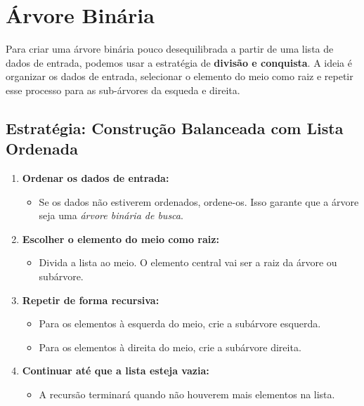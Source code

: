 \documentclass[a4paper,12pt]{article}
\begin{document}
\section*{Árvore Binária}

Para criar uma árvore binária pouco desequilibrada a partir de uma lista de dados de entrada, podemos usar a estratégia de \textbf{divisão e conquista}. A ideia é organizar os dados de entrada, selecionar o elemento do meio como raiz e repetir esse processo para as sub-árvores da esqueda e direita.

\subsection*{Estratégia: Construção Balanceada com Lista Ordenada}

\begin{enumerate}
    \item \textbf{Ordenar os dados de entrada:}
    \begin{itemize}
        \item Se os dados não estiverem ordenados, ordene-os. Isso garante que a árvore seja uma \textit{árvore binária de busca}.
    \end{itemize}

    \item \textbf{Escolher o elemento do meio como raiz:}
    \begin{itemize}
        \item Divida a lista ao meio. O elemento central vai ser a raiz da árvore ou subárvore.
    \end{itemize}

    \item \textbf{Repetir de forma recursiva:}
    \begin{itemize}
        \item Para os elementos à esquerda do meio, crie a subárvore esquerda.
        \item Para os elementos à direita do meio, crie a subárvore direita.
    \end{itemize}

    \item \textbf{Continuar até que a lista esteja vazia:}
    \begin{itemize}
        \item A recursão terminará quando não houverem mais elementos na lista.
    \end{itemize}
\end{enumerate}
\end{document}

